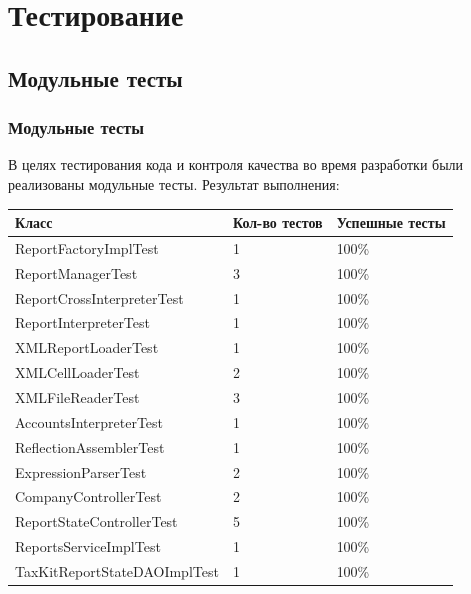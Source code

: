 \documentclass[xcolor=pdftex, dvipsnames, table]{beamer}
\begin{document}
\section{Тестирование}
\subsection{Модульные тесты}
\begin{frame}
  \frametitle{Модульные тесты}
  В целях тестирования кода и контроля качества во время разработки были реализованы модульные тесты.
  Результат выполнения:
  \begin{center}
    \small {
      \begin{tabular}{|m{6cm}|m{2cm}|m{2cm}|} \hline
        \textbf{Класс} &
        \textbf{Кол-во тестов} &
        \textbf{Успешные тесты} \\ \hline
        ReportFactoryImplTest & 1 & 100\% \\ \hline
        ReportManagerTest & 3 & 100\% \\ \hline
        ReportCrossInterpreterTest & 1 & 100\% \\ \hline
        ReportInterpreterTest & 1 & 100\% \\ \hline
        XMLReportLoaderTest & 1 & 100\% \\ \hline
        XMLCellLoaderTest & 2 & 100\% \\ \hline
        XMLFileReaderTest & 3 & 100\% \\ \hline
        AccountsInterpreterTest & 1 & 100\% \\ \hline
        ReflectionAssemblerTest & 1 & 100\% \\ \hline
        ExpressionParserTest & 2 & 100\% \\ \hline
        CompanyControllerTest & 2 & 100\% \\ \hline
        ReportStateControllerTest & 5 & 100\%  \\ \hline
        ReportsServiceImplTest & 1 & 100\%  \\ \hline
        TaxKitReportStateDAOImplTest & 1 & 100\%  \\ \hline
      \end{tabular}
    }
  \end{center}
\end{frame}
\end{document}

